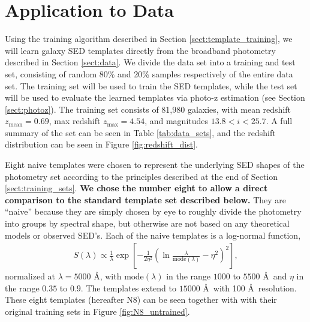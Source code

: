 \documentclass[twocolumn]{aastex63}
\begin{document}
\section{Application to Data}

    \label{sect:application}

    Using the training algorithm described in Section \ref{sect:template_training}, we will learn galaxy SED templates directly from the broadband photometry described in Section \ref{sect:data}.
    We divide the data set into a training and test set, consisting of random 80\% and 20\% samples respectively of the entire data set.
    The training set will be used to train the SED templates, while the test set will be used to evaluate the learned templates via photo-z estimation (see Section \ref{sect:photoz}).
    The training set consists of 81,980 galaxies, with mean redshift $z_\text{mean} = 0.69$, max redshift $z_\text{max} = 4.54$, and magnitudes $13.8 < i < 25.7$.
    A full summary of the set can be seen in Table \ref{tab:data_sets}, and the redshift distribution can be seen in Figure \ref{fig:redshift_dist}.

    Eight naive templates were chosen to represent the underlying SED shapes of the photometry set according to the principles described at the end of Section \ref{sect:training_sets}.
    \textbf{We chose the number eight to allow a direct comparison to the standard template set described below.} 
    They are ``naive'' because they are simply chosen by eye to roughly divide the photometry into groups by spectral shape, but otherwise are not based on any theoretical models or observed SED's.
    Each of the naive templates is a log-normal function,
    \begin{align}
        S(\lambda) \propto \frac{1}{\lambda} \exp{\left[ -\frac{1}{2\eta^2} \left( \ln{\frac{\lambda}{\text{mode}(\lambda)}}-\eta^2 \right)^2 \right]},
    \end{align}
    normalized at $\lambda = 5000$ \AA, with $\text{mode}(\lambda)$ in the range $1000$ to $5500$ \AA\  and $\eta$ in the range $0.35$ to $0.9$. 
    The templates extend to $15000$ \AA\ with 100 \AA\ resolution.
    These eight templates (hereafter N8) can be seen together with with their original training sets in Figure \ref{fig:N8_untrained}.
\end{document}
